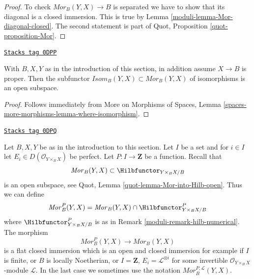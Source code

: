 \begin{proof}

To check $\mathit{Mor}_B(Y, X) \to B$ is separated we have to
show that its diagonal is a closed immersion. This
is true by Lemma \ref{moduli-lemma-Mor-diagonal-closed}.
The second statement is part of
Quot, Proposition \ref{quot-proposition-Mor}.
\end{proof}

\begin{lemma}
\label{moduli-lemma-Isom-in-Mor}
\href{https://stacks.math.columbia.edu/tag/0DPP}{\texttt{Stacks tag 0DPP}}

With $B, X, Y$ as in the introduction of this section, in addition
assume $X \to B$ is proper. Then the
subfunctor $\mathit{Isom}_B(Y, X) \subset \mathit{Mor}_B(Y, X)$
of isomorphisms is an open subspace.
\end{lemma}

\begin{proof}
Follows immediately from More on Morphisms of Spaces, Lemma
\ref{spaces-more-morphisms-lemma-where-isomorphism}.
\end{proof}

\begin{remark}

\label{moduli-remark-Mor-numerical}
\href{https://stacks.math.columbia.edu/tag/0DPQ}{\texttt{Stacks tag 0DPQ}}

Let $B, X, Y$ be as in the introduction to this section.
Let $I$ be a set and for $i \in I$ let
$E_i \in D(\mathcal{O}_{Y \times_B X})$ be perfect.
Let $P : I \to \mathbf{Z}$ be a function. Recall that
$$
\mathit{Mor}_B(Y, X) \subset
\Hilbfunctor_{Y \times_B X/B}
$$
is an open subspace, see Quot, Lemma \ref{quot-lemma-Mor-into-Hilb-open}.
Thus we can define
$$
\mathit{Mor}^P_B(Y, X) =
\mathit{Mor}_B(Y, X) \cap \Hilbfunctor^P_{Y \times_B X/B}
$$
where $\Hilbfunctor^P_{Y \times_B X/B}$ is as in
Remark \ref{moduli-remark-hilb-numerical}. The morphism
$$
\mathit{Mor}^P_B(Y, X) \longrightarrow \mathit{Mor}_B(Y, X)
$$
is a flat closed immersion which is an open and closed immersion
for example if $I$ is finite, or $B$ is locally Noetherian, or
$I = \mathbf{Z}$, $E_i = \mathcal{L}^{\otimes i}$
for some invertible $\mathcal{O}_{Y \times_B X}$-module $\mathcal{L}$.
In the last case we sometimes use the notation
$\mathit{Mor}^{P, \mathcal{L}}_B(Y, X)$.
\end{remark}

